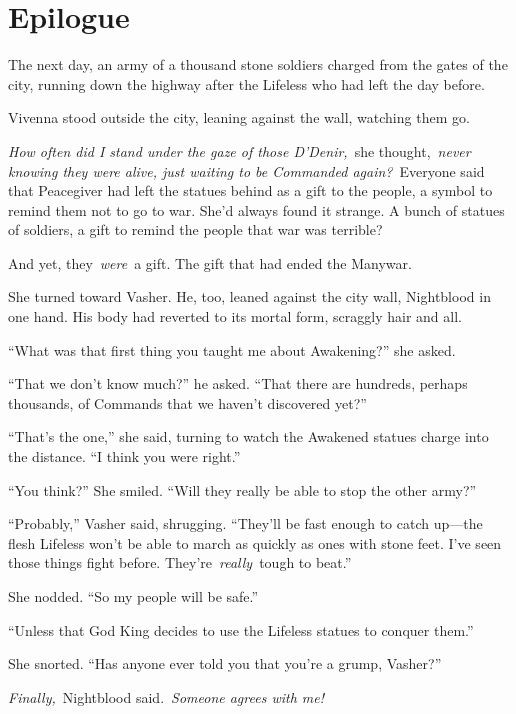 \chapter*{Epilogue}

The next day, an army of a thousand stone soldiers charged from the gates of the city, running down the highway after the Lifeless who had left the day before.

Vivenna stood outside the city, leaning against the wall, watching them go.

\textit{How often did I stand under the gaze of those D’Denir,}~she thought,~\textit{never knowing they were alive, just waiting to be Commanded again?}~Everyone said that Peacegiver had left the statues behind as a gift to the people, a symbol to remind them not to go to war. She’d always found it strange. A bunch of statues of soldiers, a gift to remind the people that war was terrible?

And yet, they~\textit{were}~a gift. The gift that had ended the Manywar.

She turned toward Vasher. He, too, leaned against the city wall, Nightblood in one hand. His body had reverted to its mortal form, scraggly hair and all.

“What was that first thing you taught me about Awakening?” she asked.

“That we don’t know much?” he asked. “That there are hundreds, perhaps thousands, of Commands that we haven’t discovered yet?”

“That’s the one,” she said, turning to watch the Awakened statues charge into the distance. “I think you were right.”

“You think?” She smiled. “Will they really be able to stop the other army?”

“Probably,” Vasher said, shrugging. “They’ll be fast enough to catch up—the flesh Lifeless won’t be able to march as quickly as ones with stone feet. I’ve seen those things fight before. They’re~\textit{really}~tough to beat.”

She nodded. “So my people will be safe.”

“Unless that God King decides to use the Lifeless statues to conquer them.”

She snorted. “Has anyone ever told you that you’re a grump, Vasher?”

\textit{Finally,}~Nightblood said.~\textit{Someone agrees with me!}

